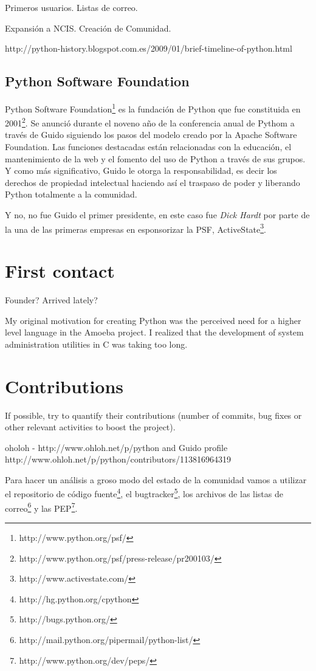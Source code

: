 \documentclass[11pt]{scrartcl}
\begin{document}
Primeros usuarios.
Listas de correo.

Expansión a NCIS.
Creación de Comunidad.

http://python-history.blogspot.com.es/2009/01/brief-timeline-of-python.html

\subsection{Python Software Foundation}

Python Software Foundation\footnote{http://www.python.org/psf/} es la fundación de Python que fue constituida en 2001\footnote{http://www.python.org/psf/press-release/pr200103/}. Se anunció durante el noveno año de la conferencia anual de Pythom a través de Guido siguiendo los pasos del modelo creado por la Apache Software Foundation.
Las funciones destacadas están relacionadas con la educación, el mantenimiento de la web y el fomento del uso de Python a través de sus grupos. Y como más significativo, Guido le otorga la responsabilidad, es decir los derechos de propiedad intelectual haciendo así el traspaso de poder y liberando Python totalmente a la comunidad.

Y no, no fue Guido el primer presidente, en este caso fue \emph{Dick Hardt} por parte de la una de las primeras empresas en esponsorizar la PSF, ActiveState\footnote{http://www.activestate.com/}.

\section{First contact}

Founder? Arrived lately?

My original motivation for creating Python was the perceived need for a higher level language in the Amoeba project. I realized that the development of system administration utilities in C was taking too long. 

\section{Contributions}

If possible, try to quantify their contributions (number of commits, bug fixes or other relevant activities to boost the project).

oholoh - http://www.ohloh.net/p/python and Guido profile http://www.ohloh.net/p/python/contributors/113816964319

Para hacer un análisis a groso modo del estado de la comunidad vamos a utilizar el repositorio de código fuente\footnote{http://hg.python.org/cpython}, el bugtracker\footnote{http://bugs.python.org/}, los archivos de las listas de correo\footnote{http://mail.python.org/pipermail/python-list/} y las PEP\footnote{http://www.python.org/dev/peps/}.
\end{document}
